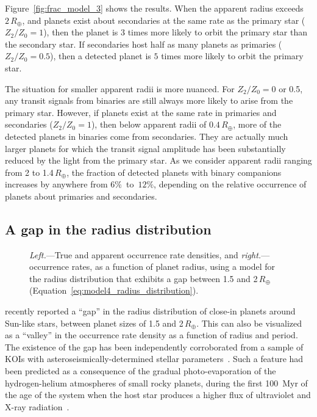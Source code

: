 \documentclass[12pt,modern]{aastex61}
\begin{document}
Figure~\ref{fig:frac_model_3} shows the results.  When the apparent
radius exceeds $2\,R_\oplus$, and planets exist about secondaries at
the same rate as the primary star ($Z_2/Z_0=1$), then the planet is
$3$ times more likely to orbit the primary star than the secondary
star.  If secondaries host half as many planets as primaries
($Z_2/Z_0=0.5$), then a detected planet is $5$ times more likely to
orbit the primary star.

The situation for smaller apparent radii is more nuanced.  For
$Z_2/Z_0=0$ or 0.5, any transit signals from binaries are still always
more likely to arise from the primary star.  However, if planets exist
at the same rate in primaries and secondaries ($Z_2/Z_0=1$), then
below apparent radii of $0.4\,R_\oplus$, more of the detected planets
in binaries come from secondaries.  They are actually much larger
planets for which the transit signal amplitude has been substantially
reduced by the light from the primary star.  As we consider apparent
radii ranging from 2 to 1.4\,$R_\oplus$, the fraction of detected
planets with binary companions increases by anywhere from
$6\%$~to~$12\%$, depending on the relative occurrence of planets about
primaries and secondaries.


\subsection{A gap in the radius distribution}
\label{sec:further_models}

\begin{figure}[!t]
    \centering
    \caption{ {\it Left.}---True and apparent occurrence rate densities,
      and {\it right.}---occurrence rates, as a function of planet
      radius, using a model for the radius distribution that exhibits
      a gap between 1.5 and 2\,$R_\oplus$
      (Equation~\ref{eq:model4_radius_distribution}). }
    \label{fig:model_4}
\end{figure}

\citet{fulton_california-_2017} recently reported a ``gap'' in the
radius distribution of close-in planets around Sun-like stars, between
planet sizes of 1.5 and 2\,$R_\oplus$.  This can also be visualized as
a ``valley'' in the occurrence rate density as a function of radius
and period.  The existence of the gap has been independently
corroborated from a sample of KOIs with asteroseismically-determined
stellar parameters~\citep{van_eylen_asteroseismic_2017}.  Such a
feature had been predicted as a consequence of the gradual
photo-evaporation of the hydrogen-helium atmospheres of small rocky
planets, during the first 100~Myr of the age of the system when the
host star produces a higher flux of ultraviolet and X-ray
radiation~\citep{owen_evaporation_2017}.
\end{document}
